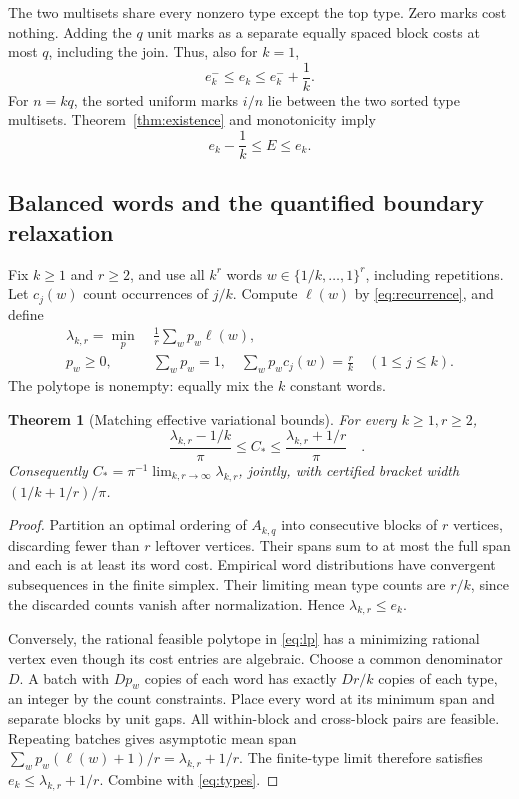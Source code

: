 \documentclass[11pt]{article}
\newtheorem{theorem}{Theorem}
\theoremstyle{definition}\newtheorem{definition}[theorem]{Definition}
\theoremstyle{remark}\newtheorem{remark}[theorem]{Remark}
\newcommand{\CC}{C_\ast}
\begin{document}
The two multisets share every nonzero type except the top type. Zero marks
cost nothing. Adding the $q$ unit marks as a separate equally spaced
block costs at most $q$, including the join. Thus, also for $k=1$,
\[
 e^-_k\le e_k\le e^-_k+\frac1k.
\]
For $n=kq$, the sorted uniform marks $i/n$ lie between the two sorted
type multisets. Theorem~\ref{thm:existence} and monotonicity imply
\begin{equation}\label{eq:types}
 e_k-\frac1k\le E\le e_k.
\end{equation}

\subsection{Balanced words and the quantified boundary relaxation}
Fix $k\ge1$ and $r\ge2$, and use all $k^r$ words
$w\in\{1/k,\ldots,1\}^r$, including repetitions. Let $c_j(w)$ count
occurrences of $j/k$. Compute $\ell(w)$ by \eqref{eq:recurrence}, and define
\begin{equation}\label{eq:lp}
\begin{split}
 \lambda_{k,r}=\min_p\ &\frac1r\sum_w p_w\ell(w),\\
 p_w\ge0,\quad &\sum_w p_w=1,\quad
 \sum_w p_wc_j(w)=\frac rk\quad(1\le j\le k).
\end{split}
\end{equation}
The polytope is nonempty: equally mix the $k$ constant words.

\begin{theorem}[Matching effective variational bounds]\label{thm:lp}
For every $k\ge1,r\ge2$,
\begin{equation}\label{eq:effective}
 \boxed{\quad\frac{\lambda_{k,r}-1/k}{\pi}\le\CC
 \le\frac{\lambda_{k,r}+1/r}{\pi}\quad}.
\end{equation}
Consequently $\CC=\pi^{-1}\lim_{k,r\to\infty}\lambda_{k,r}$, jointly,
with certified bracket width $(1/k+1/r)/\pi$.
\end{theorem}
\begin{proof}
Partition an optimal ordering of $A_{k,q}$ into consecutive blocks of
$r$ vertices, discarding fewer than $r$ leftover vertices. Their spans
sum to at most the full span and each is at least its word cost.
Empirical word distributions have convergent subsequences in the finite
simplex. Their limiting mean type counts are $r/k$, since the discarded
counts vanish after normalization. Hence $\lambda_{k,r}\le e_k$.

Conversely, the rational feasible polytope in \eqref{eq:lp} has a minimizing
rational vertex even though its cost entries are algebraic. Choose a
common denominator $D$. A batch with $Dp_w$ copies of each word has
exactly $Dr/k$ copies of each type, an integer by the count constraints.
Place every word at its minimum span and separate blocks by unit gaps.
All within-block and cross-block pairs are feasible. Repeating batches
gives asymptotic mean span
$\sum_w p_w(\ell(w)+1)/r=\lambda_{k,r}+1/r$.
The finite-type limit therefore satisfies
$e_k\le\lambda_{k,r}+1/r$. Combine with \eqref{eq:types}.
\end{proof}
\end{document}
